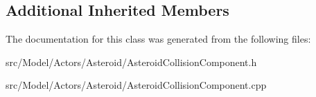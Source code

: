 \subsection*{Additional Inherited Members}


The documentation for this class was generated from the following files\+:\begin{DoxyCompactItemize}
\item 
src/\+Model/\+Actors/\+Asteroid/Asteroid\+Collision\+Component.\+h\item 
src/\+Model/\+Actors/\+Asteroid/Asteroid\+Collision\+Component.\+cpp\end{DoxyCompactItemize}
